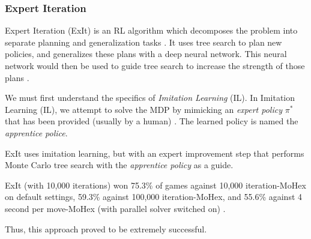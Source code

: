 \subsubsection{Expert Iteration}

Expert Iteration (ExIt) is an RL algorithm which decomposes the problem into separate planning and
generalization tasks \cite{rlhex}. It uses tree search to plan new policies, and generalizes these plans with a deep neural network. This neural network would then be used to guide tree search to increase the strength of those plans \cite{rlhex}. 

We must first understand the specifics of \textit{Imitation Learning} (IL). In Imitation Learning (IL), we attempt to solve the MDP by mimicking an \textit{expert policy} $\pi^*$ that has been provided (usually by a human) \cite{rlhex}. The learned policy is named the \textit{apprentice police}.

ExIt uses imitation learning, but with an expert improvement step that performs Monte Carlo tree search with the \textit{apprentice policy} as a guide.

ExIt (with 10,000 iterations) won 75.3\% of games against 10,000 iteration-MoHex on default
settings, 59.3\% against 100,000 iteration-MoHex, and 55.6\% against 4 second per move-MoHex
(with parallel solver switched on) \cite{rlhex}.

Thus, this approach proved to be extremely successful.


